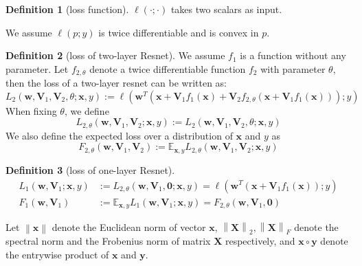 \documentclass{article}
\theoremstyle{plain}
\theoremstyle{definition}
\newtheorem{defn}{Definition}
\newcommand{\norm}[1]{\left\lVert#1\right\rVert}
\begin{document}
\begin{defn}[loss function]
	$\ell(\cdot;\cdot)$ takes two scalars as input.
\end{defn}

\begin{flushleft}
	We assume $\ell(p;y)$ is twice differentiable and is convex in $p$.
\end{flushleft}

\begin{defn}[loss of two-layer Resnet]
	We assume $f_1$ is a function without any parameter. Let $f_{2,\theta}$ denote a twice differentiable function $f_2$ with parameter $\theta$, then the loss of a two-layer resnet can be written as:
	\[L_2(\mathbf{w},\mathbf{V}_1,\mathbf{V}_2,\theta;\mathbf{x},y):=\ell\left(\mathbf{w}^T(\mathbf{x}+\mathbf{V}_1f_1(\mathbf{x})+\mathbf{V}_2f_{2,\theta}(\mathbf{x}+\mathbf{V}_1f_1(\mathbf{x})));y\right)\]
	When fixing $\theta$, we define
	\[L_{2,\theta}(\mathbf{w},\mathbf{V}_1,\mathbf{V}_2;\mathbf{x},y):=L_2(\mathbf{w},\mathbf{V}_1,\mathbf{V}_2,\theta;\mathbf{x},y)\]
	We also define the expected loss over a distribution of $\mathbf{x}$ and $y$ as
	\[F_{2,\theta}(\mathbf{w},\mathbf{V}_1,\mathbf{V}_2):=\mathbb{E}_{\mathbf{x},y}L_{2,\theta}(\mathbf{w},\mathbf{V}_1,\mathbf{V}_2;\mathbf{x},y)\]
\end{defn}

\begin{defn}[loss of one-layer Resnet]
	\begin{align*}
	L_1(\mathbf{w},\mathbf{V}_1;\mathbf{x},y)&:=L_{2,\theta}(\mathbf{w},\mathbf{V}_1,\mathbf{0};\mathbf{x},y)=\ell\left(\mathbf{w}^T(\mathbf{x}+\mathbf{V}_1f_1(\mathbf{x}));y\right)\\
	F_1(\mathbf{w},\mathbf{V}_1)&:=\mathbb{E}_{\mathbf{x},y}L_1(\mathbf{w},\mathbf{V}_1;\mathbf{x},y)=F_{2,\theta}(\mathbf{w},\mathbf{V}_1,\mathbf{0})
	\end{align*}
\end{defn}

\begin{flushleft}
	Let $\norm{\mathbf{x}}$ denote the Euclidean norm of vector $\mathbf{x}$, $\norm{\mathbf{X}}_2,\norm{\mathbf{X}}_F$ denote the spectral norm and the Frobenius norm of matrix $\mathbf{X}$ respectively, and $\mathbf{x}\circ\mathbf{y}$ denote the entrywise product of $\mathbf{x}$ and $\mathbf{y}$.
\end{flushleft}
\end{document}
